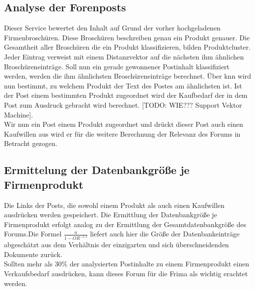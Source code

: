 \subsection{Analyse der Forenposts}
Dieser Service bewertet den Inhalt auf Grund der vorher hochgeladenen Firmenbroschüren. Diese Broschüren beschreiben genau ein Produkt genauer. Die Gesamtheit aller Broschüren die ein Produkt klassifizieren, bilden Produktcluster. Jeder Eintrag verweist mit einem Distanzvektor auf die nächsten ihm ähnlichen Broschüreneinträge. Soll nun ein gerade gewonnener Postinhalt klassifiziert werden, werden die ihm ähnlichsten Broschüreneinträge berechnet. Über knn wird nun bestimmt, zu welchem Produkt der Text des Postes am ähnlichsten ist. Ist der Post einem bestimmten Produkt zugeordnet wird der Kaufbedarf der in dem Post zum Ausdruck gebracht wird berechnet. [TODO: WIE??? Support Vektor Machine].\\
Wir nun ein Post einem Produkt zugeordnet und drückt dieser Post auch einen Kaufwillen aus wird er für die weitere Berechnung der Relevanz des Forums in Betracht gezogen.
\subsection{Ermittelung der Datenbankgröße je Firmenprodukt}
Die Links der Posts, die sowohl einem Produkt als auch einen Kaufwillen ausdrücken werden gespeichert. Die Ermittlung der Datenbankgröße je Firmenprodukt erfolgt analog zu der Ermittlung der Gesamtdatenbankgröße des Forums.Die Formel \(\frac{u}{1-OR^{-1.1}}\) liefert auch hier die Größe der Datenbankeinträge abgeschätzt aus dem Verhältnis der einzigarten und sich überschneidenden Dokumente zurück.\\
Sollten mehr als 30\% der analysierten Postinhalte zu einem Firmenprodukt einen Verkaufsbedarf ausdrücken, kann dieses Forum für die Frima als wichtig erachtet werden.

\newpage